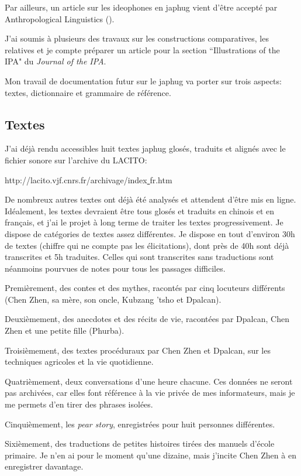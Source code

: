 \documentclass[oldfontcommands,oneside,a4paper,11pt]{memoir}
\begin{document}
	Par ailleurs, un article sur les ideophones en japhug vient d'être accepté par Anthropological Linguistics (\citealt{japhug14ideophones}).
	
	J'ai soumis à plusieurs des travaux sur les constructions comparatives, les relatives et je compte préparer un article pour la section ``Illustrations of the IPA" du \textit{Journal of the IPA}.
	
	Mon travail de documentation futur sur le japhug va porter sur trois aspects:  textes,  dictionnaire et grammaire de référence.
	
\subsection{Textes}
J’ai déjà rendu accessibles huit textes japhug glosés, traduits et alignés avec le fichier sonore sur l’archive du LACITO:
	
	{http://lacito.vjf.cnrs.fr/archivage/index{\underline{  }}fr.htm}
	
De nombreux autres textes ont déjà été analysés et attendent d’être mis en ligne. Idéalement, les textes devraient être tous glosés et traduits en chinois et en français, et j'ai le projet à long terme de traiter les textes progressivement. Je dispose de catégories de textes assez différentes. Je dispose en tout d'environ 30h de textes (chiffre qui ne compte pas les élicitations), dont près de 40h sont déjà transcrites et 5h traduites. Celles qui sont transcrites sans traductions sont néanmoins pourvues de notes pour tous les passages difficiles.


Premièrement, des contes et des mythes, racontés par cinq locuteurs différents (Chen Zhen, sa mère, son oncle, Kubzang 'tsho et Dpalcan).

Deuxièmement, des anecdotes et des récits de vie, racontées par Dpalcan, Chen Zhen et une petite fille (Phurba).

Troisièmement, des textes procéduraux par Chen Zhen et Dpalcan, sur les techniques agricoles et la vie quotidienne.

Quatrièmement, deux conversations d'une heure chacune. Ces données ne seront pas archivées, car elles font référence à la vie privée de mes informateurs, mais je me permets d'en tirer des phrases isolées.

Cinquièmement, les \textit{pear story}, enregistrées pour huit personnes différentes.  

Sixièmement, des traductions de petites histoires tirées des manuels d'école primaire. Je n'en ai pour le moment qu'une dizaine, mais j'incite Chen Zhen à en enregistrer davantage.
	
\end{document}

